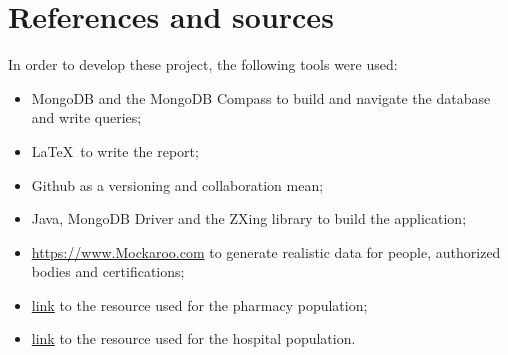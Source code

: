 \documentclass[12pt, a4paper]{article}
\begin{document}
\clearpage 

\section{References and sources}

In order to develop these project, the following tools were used:

\begin{itemize}
    \item MongoDB and the MongoDB Compass to build and navigate the database 
        and write queries;
    \item \LaTeX~to write the report;
    \item Github as a versioning and collaboration mean;
    \item Java, MongoDB Driver and the ZXing library to build the application;
    \item \url{https://www.Mockaroo.com} 
        to generate realistic data for people, authorized bodies and 
        certifications;
    \item \href{https://data.gov.sg/dataset/listing-of-licensed-pharmacies}{link}
        to the resource used for the pharmacy population;
    \item \href{https://corgis-edu.github.io/corgis/csv/hospitals/}{link}
        to the resource used for the hospital population.
\end{itemize}

\clearpage
\end{document}
